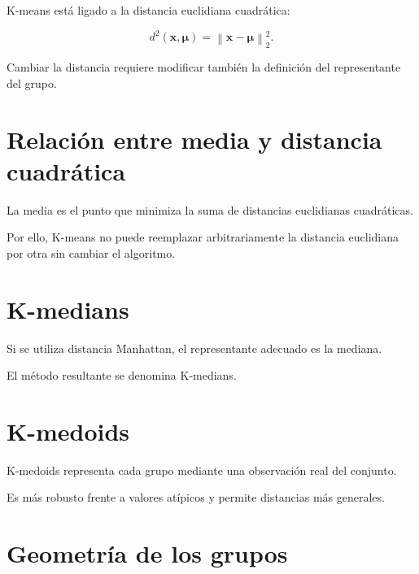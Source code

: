 \documentclass[
  spanish,
  10.5pt,
  letterpaper,
  DIV=11,
  numbers=noendperiod,
  oneside,
  open=any]{scrreprt}
\theoremstyle{definition}
\theoremstyle{definition}
\theoremstyle{plain}
\theoremstyle{remark}
\begin{document}

K-means está ligado a la distancia euclidiana cuadrática:

\[
d^2(\mathbf{x},\boldsymbol{\mu})
=
\left\|
\mathbf{x}-\boldsymbol{\mu}
\right\|_2^2.
\]

Cambiar la distancia requiere modificar también la definición del
representante del grupo.

\section*{Relación entre media y distancia
cuadrática}\label{relaciuxf3n-entre-media-y-distancia-cuadruxe1tica}


La media es el punto que minimiza la suma de distancias euclidianas
cuadráticas.

Por ello, K-means no puede reemplazar arbitrariamente la distancia
euclidiana por otra sin cambiar el algoritmo.

\section*{K-medians}\label{k-medians}


Si se utiliza distancia Manhattan, el representante adecuado es la
mediana.

El método resultante se denomina K-medians.

\section*{K-medoids}\label{k-medoids}


K-medoids representa cada grupo mediante una observación real del
conjunto.

Es más robusto frente a valores atípicos y permite distancias más
generales.

\section*{Geometría de los grupos}\label{geometruxeda-de-los-grupos}
\end{document}
